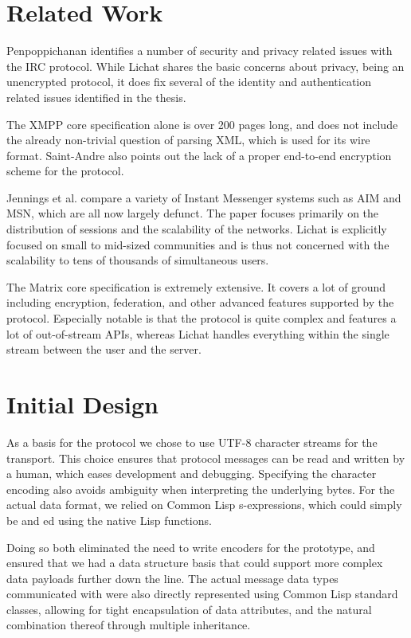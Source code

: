 \documentclass[format=sigconf]{acmart}
\begin{document}
\section{Related Work}\label{relatedwork}
Penpoppichanan\cite{penpoppichanan2001security} identifies a number of security and privacy related issues with the IRC protocol. While Lichat shares the basic concerns about privacy, being an unencrypted protocol, it does fix several of the identity and authentication related issues identified in the thesis.

The XMPP core specification\cite{saint2004extensible} alone is over 200 pages long, and does not include the already non-trivial question of parsing XML, which is used for its wire format. Saint-Andre\cite{saint2009xmpp} also points out the lack of a proper end-to-end encryption scheme for the protocol.

Jennings et al.\cite{jennings2006study} compare a variety of Instant Messenger systems such as AIM and MSN, which are all now largely defunct. The paper focuses primarily on the distribution of sessions and the scalability of the networks. Lichat is explicitly focused on small to mid-sized communities and is thus not concerned with the scalability to tens of thousands of simultaneous users.

The Matrix core specification\cite{matrix} is extremely extensive. It covers a lot of ground including encryption, federation, and other advanced features supported by the protocol. Especially notable is that the protocol is quite complex and features a lot of out-of-stream APIs, whereas Lichat handles everything within the single stream between the user and the server.

\section{Initial Design}\label{initial-design}
As a basis for the protocol we chose to use UTF-8 character streams for the transport. This choice ensures that protocol messages can be read and written by a human, which eases development and debugging. Specifying the character encoding also avoids ambiguity when interpreting the underlying bytes. For the actual data format, we relied on Common Lisp s-expressions, which could simply be  and ed using the native Lisp functions.

Doing so both eliminated the need to write encoders for the prototype, and ensured that we had a data structure basis that could support more complex data payloads further down the line. The actual message data types communicated with were also directly represented using Common Lisp standard classes, allowing for tight encapsulation of data attributes, and the natural combination thereof through multiple inheritance.
\end{document}
